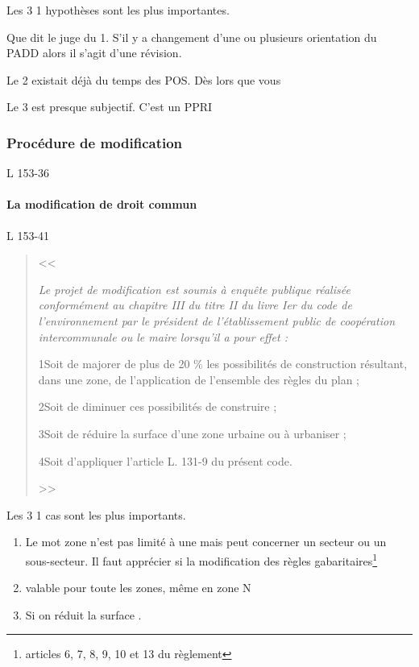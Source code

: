 	 	Les 3 1\ieres{} hypothèses sont les plus importantes.
	 	
	 	Que dit le juge du 1. S'il y a changement d'une ou plusieurs orientation du PADD alors il s'agit d'une révision.
	 	
	 	Le 2 existait déjà du temps des POS. Dès lors que vous 
	 	
	 	Le 3 est presque subjectif. C'est un PPRI
	 	
	 	\subsubsection{Procédure de modification} L 153-36
	 	
		 	\paragraph{La modification de droit commun} L 153-41
		 		
		 		\begin{quote}
		 			<< {\itshape
		 				Le projet de modification est soumis à enquête publique réalisée conformément au chapitre III du titre II du livre Ier du code de l'environnement par le président de l'établissement public de coopération intercommunale ou le maire lorsqu'il a pour effet :
		 				
		 				1\degres Soit de majorer de plus de 20 \% les possibilités de construction résultant, dans une zone, de l'application de l'ensemble des règles du plan ;
		 				
		 				2\degres Soit de diminuer ces possibilités de construire ;
		 				
		 				3\degres Soit de réduire la surface d'une zone urbaine ou à urbaniser ;
		 				
		 				4\degres Soit d'appliquer l'article L. 131-9 du présent code.
		 			} >>
		 		\end{quote}
	 		
	 			Les 3 1\iers{} cas sont les plus importants.
	 			\begin{enumerate}
	 				\item Le mot zone n'est pas limité à une mais peut concerner un secteur ou un sous-secteur. Il faut apprécier si la modification des règles gabaritaires\footnote{articles 6, 7, 8, 9, 10 et 13 du règlement} 
	 				
	 				\item  valable pour toute les zones, même en zone N
	 				
	 				\item Si on réduit la surface . 
	 			\end{enumerate}
	 		
